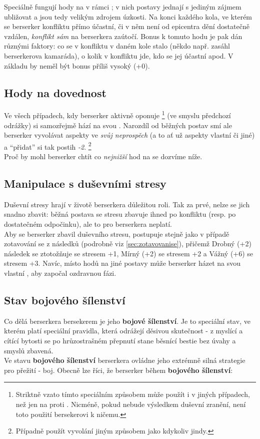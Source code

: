 \begin{tcolorbox}[%
    enhanced, 
    breakable,
    skin first=enhanced,
    skin middle=enhanced,
    skin last=enhanced,
    ]{}
Speciálně fungují hody na  v rámci ; v nich postavy jednají s jediným zájmem ubližovat a jsou tedy velikým zdrojem úzkosti. Na konci každého kola, ve kterém se berserker konfliktu přímo účastní, či v něm není od epicentra dění dostatečně vzdálen, \textit{konflikt sám} na berserkera  zaútočí. Bonus k tomuto hodu je pak dán různými faktory: co se v konfliktu v daném kole stalo (někdo např. zasáhl berserkerova kamaráda), o kolik v konfliktu jde, kdo se jej účastní apod. V základu by neměl být bonus příliš vysoký (+0).
\subsection*{Hody na dovednost }
Ve všech případech, kdy berserker aktivně oponuje   \footnote{Striktně vzato tímto speciálním způsobem může použít  i v jiných případech, než jen na  proti . Nicméně, pokud nebude výsledkem duševní zranění, není toto použití bersekerovi k ničemu.} (ve smyslu předchozí odrážky) si samozřejmě hází na  svou . Narozdíl od běžných postav smí ale berserker vyvolávat aspekty ve \textit{svůj neprospěch} (a to ať už aspekty vlastní či jiné) a ``přidat'' si tak postih \textit{-2}. \footnote{Případně použít vyvolání jiným způsobem jako kdykoliv jindy.}\\
Proč by mohl berserker chtít co \textit{nejnižší} hod na  se dozvíme níže.

\subsection*{Manipulace s duševními stresy}
Duševní stresy hrají v životě berserkera důležitou roli. Tak za prvé, nelze se jich snadno zbavit: běžná postava se stresu zbavuje ihned po konfliktu (resp. po dostatečném odpočinku), ale to pro berserkera neplatí. \\
Aby se berserker zbavil duševního stresu, postupuje stejně jako v případě zotavování se z následků (podrobně viz \ref{sec:zotavovanise}), přičemž Drobný (+2) následek se ztotožňuje se stresem +1, Mírný (+2) se stresem +2 a Vážný (+6) se stresem +3. Navíc, místo hodů na  jiné postavy může berserker házet na svou vlastní , aby započal ozdravnou fázi.

\subsection*{Stav bojového šílenství}
Co dělá berserkera bersekerem je jeho \textbf{bojové šílenství}. Je to speciální stav, ve kterém platí speciální pravidla, která odrážejí děsivou skutečnost - z myslící a cítící bytosti se po hrůzostrašném přepnutí stane běsnící bestie bez úvahy a smyslů zbavená. \\
Ve stavu \textbf{bojového šílenství} berserkera ovládne jeho extrémně silná strategie pro přežití - boj. Obecně lze říci, že berserker během \textbf{bojového šílenství}:


\end{tcolorbox}
